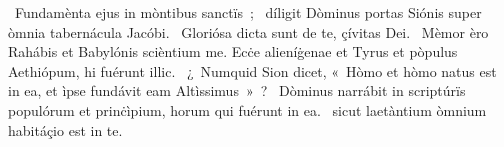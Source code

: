 ~Fundamènta ejus in mòntibus sanctïs~; 
~díligit Dòminus portas Siónis super òmnia tabernácula Jacóbi. 
~Gloriósa dicta sunt de te, çívitas Dei. 
~Mèmor èro Rahábis et Babylónis scièntium me. Ecċe alieníġenae et Tyrus et pòpulus Aethiópum, hi fuérunt illic. 
~¿~Numquid Sion dicet, «~Hòmo et hòmo natus est in ea, et ìpse fundávit eam Altìssimus~»~? 
~Dòminus narrábit in scriptúrïs populórum et prinċìpium, horum qui fuérunt in ea. 
~sicut laetàntium òmnium habitáçio est in te. 
